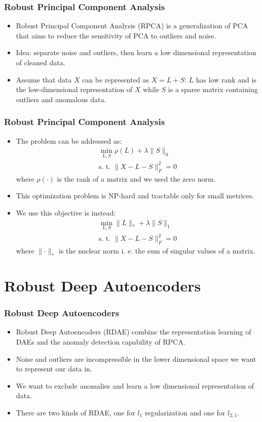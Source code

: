 \documentclass{beamer}
\theoremstyle{plain}
\theoremstyle{definition}
\theoremstyle{remark}
\newcommand{\norm}[1]{\lVert#1\rVert}
\begin{document}
\begin{frame}
	\frametitle{Robust Principal Component Analysis}
	\begin{itemize}
		\item Robust Principal Component Analysis (RPCA) is a generalization of PCA that aims to reduce the sensitivity of PCA to outliers and noise.
		\item Idea: separate noise and outliers, then learn a low dimensional representation of cleaned data.
		\item Assume that data $X$ can be represented as $X = L + S$: $L$ has low rank and is the low-dimensional representation of $X$ while $S$ is a sparse matrix containing outliers and anomalous data.
	\end{itemize}
\end{frame}

\begin{frame}
	\frametitle{Robust Principal Component Analysis}
	\begin{itemize}
		\item The problem can be addressed as:
			\begin{align}
				\min_{L,S}{\rho(L)+\lambda \norm{S}_{0}}\\
				\text{s. t. }\norm{X - L - S}_{F}^2=0 
			\end{align}
			where $\rho(\cdot)$ is the rank of a matrix and we used the zero norm.
		\item This optimization problem is NP-hard and tractable only for small metrices.
		\item We use this objective is instead:
			\begin{align}
				\min_{L,S}{\norm{L}_{*}+\lambda \norm{S}_{1}}\\
				\text{s. t. }\norm{X - L - S}_F^2=0
			\end{align}
			where $\norm{\cdot}_*$ is the nuclear norm i. e. the sum of singular values of a matrix.
	\end{itemize}
\end{frame}

\section{Robust Deep Autoencoders}

\begin{frame}
	\frametitle{Robust Deep Autoencoders}
	\begin{itemize}
		\item Robust Deep Autoencoders (RDAE) combine the representation learning of DAEs and the anomaly detection capability of RPCA.
		\item Noise and outliers are incompressible in the lower dimensional space we want to represent our data in.
		\item We want to exclude anomalies and learn a low dimensional representation of data.
		\item There are two kinds of RDAE, one for $l_1$ regularization and one for $l_{2,1}$.
	\end{itemize}
\end{frame}
\end{document}
